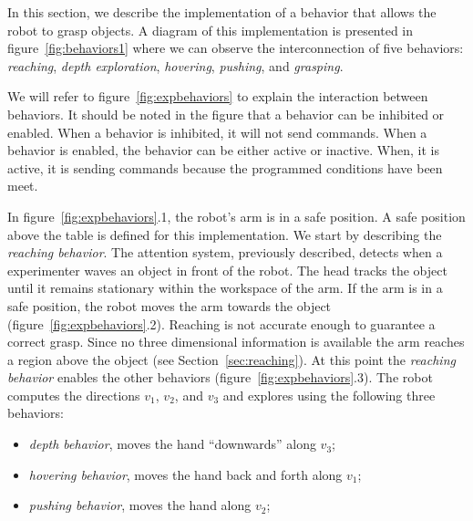 In this section, we describe the implementation of a behavior that
allows the robot to grasp objects. A diagram of this
implementation is presented in figure~\ref{fig:behaviors1} where
we can observe the interconnection of five behaviors:
\emph{reaching}, \emph{depth exploration}, \emph{hovering},
\emph{pushing}, and \emph{grasping}.

We will refer to figure~\ref{fig:expbehaviors} to explain the
interaction between behaviors. It should be noted in the figure
that a behavior can be inhibited or enabled. When a behavior is
inhibited, it will not send commands. When a behavior is enabled,
the behavior can be either active or inactive. When, it is active,
it is sending commands because the programmed conditions have been
meet.

In figure~\ref{fig:expbehaviors}.1, the robot's arm is in a safe
position. A safe position above the table is defined for this
implementation. We start by describing the \emph{reaching
behavior}. The attention system, previously described, detects
when a experimenter waves an object in front of the robot. The
head tracks the object until it remains stationary within the
workspace of the arm. If the arm is in a safe position, the robot
moves the arm towards the object
(figure~\ref{fig:expbehaviors}.2). Reaching is not accurate enough
to guarantee a correct grasp. Since no three dimensional
information is available the arm reaches a region above the object
(see Section~\ref{sec:reaching}). At this point the \emph{reaching
behavior} enables the other behaviors
(figure~\ref{fig:expbehaviors}.3). The robot computes the
directions $v_1$, $v_2$, and $v_3$ and explores using the
following three behaviors:
%
\begin{itemize}
%
\item \emph{depth behavior}, moves the hand ``downwards'' along
$v_3$;
%
\item \emph{hovering behavior}, moves the hand back and forth
along $v_1$;
%
\item \emph{pushing behavior}, moves the hand along $v_2$;
%
\end{itemize}

